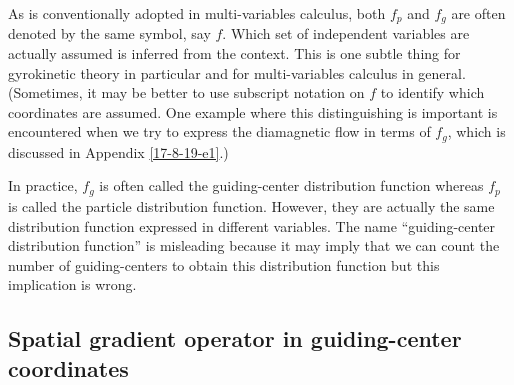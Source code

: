 \documentclass{llncs}
\begin{document}
As is conventionally adopted in multi-variables calculus, both $f_p$ and $f_g$
are often denoted by the same symbol, say $f$. Which set of independent
variables are actually assumed is inferred from the context. This is one
subtle thing for gyrokinetic theory in particular and for multi-variables
calculus in general. (Sometimes, it may be better to use subscript notation on
$f$ to identify which coordinates are assumed. One example where this
distinguishing is important is encountered when we try to express the
diamagnetic flow in terms of $f_g$, which is discussed in Appendix
\ref{17-8-19-e1}.)

In practice, $f_g$ is often called the guiding-center distribution function
whereas $f_p$ is called the particle distribution function. However, they are
actually the same distribution function expressed in different variables. The
name ``guiding-center distribution function'' is misleading because it may
imply that we can count the number of guiding-centers to obtain this
distribution function but this implication is wrong.

\subsection{Spatial gradient operator in guiding-center coordinates}
\end{document}
